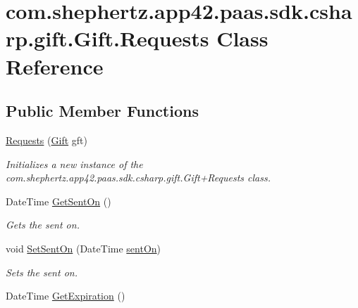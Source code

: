 \hypertarget{classcom_1_1shephertz_1_1app42_1_1paas_1_1sdk_1_1csharp_1_1gift_1_1_gift_1_1_requests}{\section{com.\+shephertz.\+app42.\+paas.\+sdk.\+csharp.\+gift.\+Gift.\+Requests Class Reference}
\label{classcom_1_1shephertz_1_1app42_1_1paas_1_1sdk_1_1csharp_1_1gift_1_1_gift_1_1_requests}
}
\subsection*{Public Member Functions}
\begin{DoxyCompactItemize}
\item 
\hyperlink{classcom_1_1shephertz_1_1app42_1_1paas_1_1sdk_1_1csharp_1_1gift_1_1_gift_1_1_requests_a4cd65cec110555718d006f963ec03f5a}{Requests} (\hyperlink{classcom_1_1shephertz_1_1app42_1_1paas_1_1sdk_1_1csharp_1_1gift_1_1_gift}{Gift} gft)
\begin{DoxyCompactList}\small\item\em Initializes a new instance of the com.\+shephertz.\+app42.\+paas.\+sdk.\+csharp.\+gift.\+Gift+\+Requests class. \end{DoxyCompactList}\item 
Date\+Time \hyperlink{classcom_1_1shephertz_1_1app42_1_1paas_1_1sdk_1_1csharp_1_1gift_1_1_gift_1_1_requests_a2004cf561fd514eaefa5e508f14b9fe2}{Get\+Sent\+On} ()
\begin{DoxyCompactList}\small\item\em Gets the sent on. \end{DoxyCompactList}\item 
void \hyperlink{classcom_1_1shephertz_1_1app42_1_1paas_1_1sdk_1_1csharp_1_1gift_1_1_gift_1_1_requests_a745331c4e0e612897d3f5dc1e10ac5af}{Set\+Sent\+On} (Date\+Time \hyperlink{classcom_1_1shephertz_1_1app42_1_1paas_1_1sdk_1_1csharp_1_1gift_1_1_gift_1_1_requests_af83b9120dade63595d80daa388219019}{sent\+On})
\begin{DoxyCompactList}\small\item\em Sets the sent on. \end{DoxyCompactList}\item 
Date\+Time \hyperlink{classcom_1_1shephertz_1_1app42_1_1paas_1_1sdk_1_1csharp_1_1gift_1_1_gift_1_1_requests_a03dc9c7065bfe8137f4a6bf7eddff5c7}{Get\+Expiration} ()

\end{DoxyCompactItemize}
